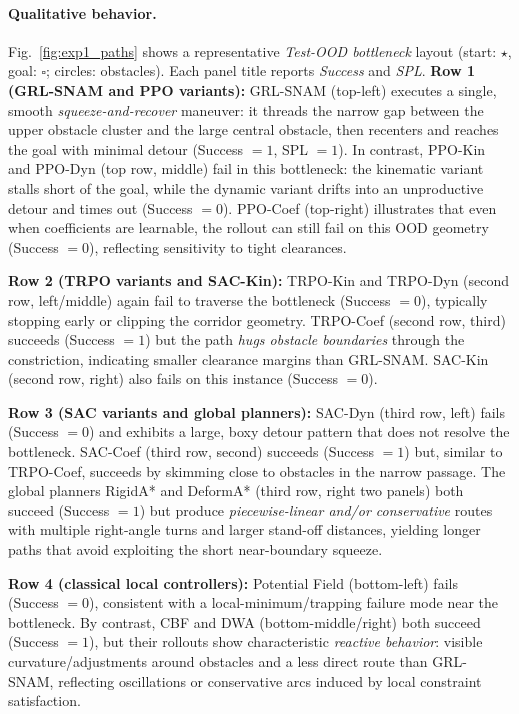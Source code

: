 \documentclass{article} %
\begin{document}
\paragraph{Qualitative behavior.}
{Fig.~\ref{fig:exp1_paths} shows a representative \emph{Test-OOD bottleneck} layout (start: $\star$, goal: $\square$; circles: obstacles). Each panel title reports \emph{Success} and \emph{SPL}.
\textbf{Row 1 (GRL-SNAM and PPO variants):}
GRL-SNAM (top-left) executes a single, smooth \emph{squeeze-and-recover} maneuver: it threads the narrow gap between the upper obstacle cluster and the large central obstacle, then recenters and reaches the goal with minimal detour (Success $=1$, SPL $=1$). In contrast, PPO-Kin and PPO-Dyn (top row, middle) fail in this bottleneck: the kinematic variant stalls short of the goal, while the dynamic variant drifts into an unproductive detour and times out (Success $=0$). PPO-Coef (top-right) illustrates that even when coefficients are learnable, the rollout can still fail on this OOD geometry (Success $=0$), reflecting sensitivity to tight clearances.

\textbf{Row 2 (TRPO variants and SAC-Kin):}
TRPO-Kin and TRPO-Dyn (second row, left/middle) again fail to traverse the bottleneck (Success $=0$), typically stopping early or clipping the corridor geometry. TRPO-Coef (second row, third) succeeds (Success $=1$) but the path \emph{hugs obstacle boundaries} through the constriction, indicating smaller clearance margins than GRL-SNAM. SAC-Kin (second row, right) also fails on this instance (Success $=0$).

\textbf{Row 3 (SAC variants and global planners):}
SAC-Dyn (third row, left) fails (Success $=0$) and exhibits a large, boxy detour pattern that does not resolve the bottleneck. SAC-Coef (third row, second) succeeds (Success $=1$) but, similar to TRPO-Coef, succeeds by skimming close to obstacles in the narrow passage. The global planners RigidA* and DeformA* (third row, right two panels) both succeed (Success $=1$) but produce \emph{piecewise-linear and/or conservative} routes with multiple right-angle turns and larger stand-off distances, yielding longer paths that avoid exploiting the short near-boundary squeeze.

\textbf{Row 4 (classical local controllers):}
Potential Field (bottom-left) fails (Success $=0$), consistent with a local-minimum/trapping failure mode near the bottleneck. By contrast, CBF and DWA (bottom-middle/right) both succeed (Success $=1$), but their rollouts show characteristic \emph{reactive behavior}: visible curvature/adjustments around obstacles and a less direct route than GRL-SNAM, reflecting oscillations or conservative arcs induced by local constraint satisfaction.}
\end{document}
